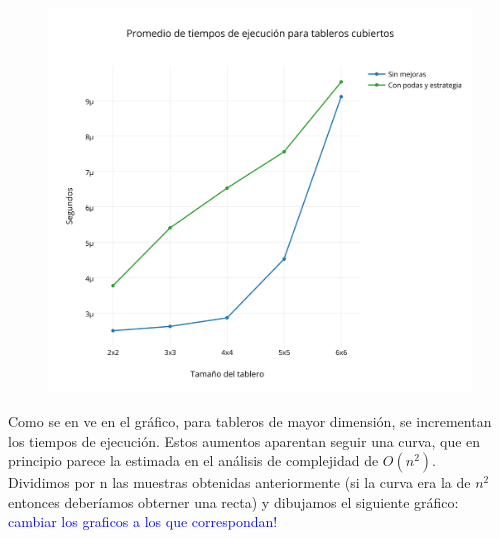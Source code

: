 \begin{figure}[h!]
   \begin{center}
	\includegraphics[scale=0.3]{../src/ej3/Mediciones/cubiertos/Promedio.png} 
   \end{center}
 \end{figure}

Como se en ve en el gr\'afico, para tableros de mayor dimensi\'on, se incrementan los tiempos de ejecuci\'on. Estos aumentos aparentan seguir una curva, que en principio parece la estimada en el an\'alisis de complejidad de $O(n^{2})$.\\

\newpage
Dividimos por n las muestras obtenidas anteriormente (si la curva era la de $n^{2}$ entonces deber\'iamos obterner una recta) y dibujamos el siguiente gr\'afico:\\


\textcolor{blue}{cambiar los graficos a los que correspondan!}

